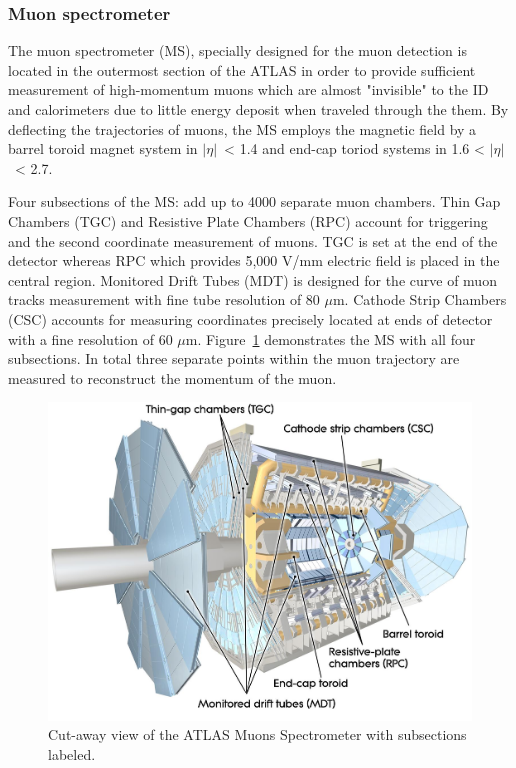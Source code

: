 \documentclass[UTF8,12pt]{ctexart}
\numberwithin{equation}{section}
\def\abseta{$|$$\eta$$|$~}
\begin{document}
\subsubsection{Muon spectrometer}
\label{sec:3.2.3}

The muon spectrometer (MS), specially designed for the muon detection is located in the outermost section of the ATLAS in order to provide sufficient measurement of high-momentum muons which are almost "invisible" to the ID and calorimeters due to little energy deposit when traveled through the them. By deflecting the trajectories of muons, the MS employs the magnetic field by a barrel toroid magnet system in \abseta < 1.4 and end-cap toriod systems in 1.6 < \abseta < 2.7. 

Four subsections of the MS: add up to 4000 separate muon chambers. Thin Gap Chambers (TGC) and Resistive Plate Chambers (RPC) account for triggering and the second coordinate measurement of muons. TGC is set at the end of the detector whereas RPC which provides 5,000 V/mm electric field is placed in the central region. Monitored Drift Tubes (MDT) is designed for the curve of muon tracks measurement with fine tube resolution of 80 $\mu$m. Cathode Strip Chambers (CSC) accounts for measuring coordinates precisely located at ends of detector with a fine resolution of 60 $\mu$m. Figure~\ref{Fig.ms} demonstrates the MS with all four subsections. In total three separate points within the muon trajectory are measured to reconstruct the momentum of the muon.


\begin{figure}[htb] 
	\centering  
	\includegraphics[width=14cm]{./fig/muon.jpg}	\caption{Cut-away view of the ATLAS Muons Spectrometer with subsections labeled.}
	\label{Fig.ms}
\end{figure}
\end{document}
